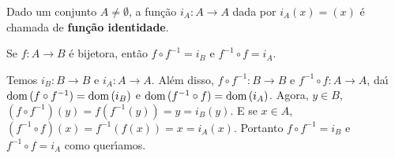 \begin{definicao}
	Dado um conjunto $A \ne \emptyset$, a fun{\c c}{\~a}o $i_{A}: A \to A$ dada por $i_{A}(x)=(x)$ {\'e} chamada de \textbf{fun{\c c}{\~a}o identidade}.
\end{definicao}

\begin{proposicao}
	Se $f : A \to B$ {\'e} bijetora, ent{\~a}o $f\circ f^{-1} = i_{B}$ e $f^{-1}\circ f = i_{A}$.
\end{proposicao}
\begin{prova}
	Temos $i_{B} : B \to B$ e $i_{A} : A \to A$. Al{\'e}m disso, $f\circ f^{-1} : B \to B$ e $f^{-1}\circ f : A \to A$, da{\'\i} ${\rm dom\,}(f\circ f^{-1}) = {\rm dom\,}(i_{B})$ e ${\rm dom\,}(f^{-1}\circ f) = {\rm dom\,}(i_{A})$. Agora, $y \in B$, $(f\circ f^{-1})(y) = f(f^{-1}(y)) = y = i_{B}(y)$. E se $x \in A$, $(f^{-1}\circ f)(x) = f^{-1}(f(x)) = x = i_{A}(x)$. Portanto $f\circ f^{-1} = i_{B}$ e $f^{-1}\circ f = i_{A}$ como quer{\'\i}amos.
\end{prova}

